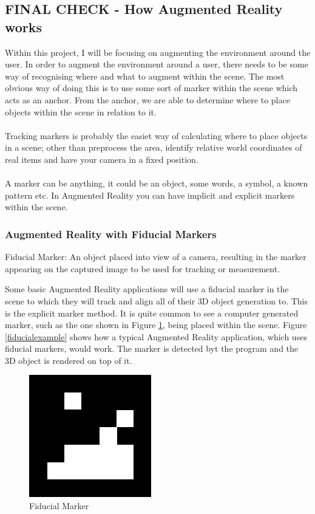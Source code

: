 \documentclass[11pt]{article}
\begin{document}
\subsection{FINAL CHECK - How Augmented Reality works}
Within this project, I will be focusing on augmenting the environment around
the user. 
In order to augment the environment around a user, there needs to be some
way of recognising where and what to augment within the scene. The most
obvious way of doing this is to use some sort of marker within the scene
which acts as an anchor. From the anchor, we are able to determine
where to place objects within the scene in relation to it. \\
\\
Tracking markers is probably the easiet way of calculating 
where to place objects in a scene; other than preprocess the area, identify
relative world coordinates of real items and have your camera in a fixed
position. \\
\\
A marker can be anything, it could be an object, some words, a symbol, a
known pattern etc. In Augmented Reality you can have implicit and explicit 
markers within the scene. 

\subsubsection{Augmented Reality with Fiducial Markers}
\begin{center}
	Fiducial Marker: An object placed into view of a camera, resulting in
	the marker appearing on the captured image to be used for tracking
	or measurement.
\end{center}

Some basic Augmented Reality applications will use a fiducial marker in
the scene to which they will track and align all of their 3D object 
generation to. This is the explicit marker method. It is quite common 
to see a computer generated marker, such as the one shown in 
Figure \ref{fiducial}, being placed within the scene. Figure
\ref{fiducialexample} shows how a typical Augmented Reality application,
which uses fiducial markers, would work. The marker is detected
byt the program and the 3D object is rendered on top of it.\\

\begin{figure}[!h]
	\centering
	\includegraphics[scale=0.8]{pics/fiducial.png}
	\caption{Fiducial Marker}
	\label{fiducial}
\end{figure}
\end{document}
